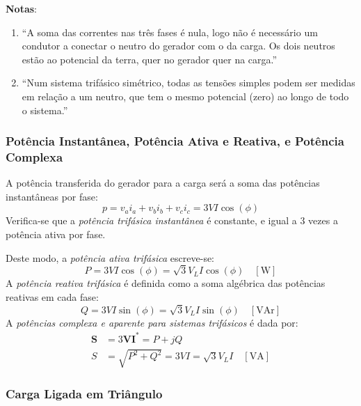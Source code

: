 \begin{mdframed} %
    \noindent \textbf{Notas}:
    \begin{enumerate}[noitemsep,nolistsep,leftmargin=*,label=\arabic*.,font=\small\bfseries]\small
        \item ``A soma das correntes nas três fases é nula, logo não é necessário um condutor a conectar o neutro do gerador com o da carga. Os dois neutros estão ao potencial da terra, quer no gerador quer na carga.''\cite{paiva2005}
        
        \item ``Num sistema trifásico simétrico, todas as tensões simples podem ser medidas em relação a um neutro, que tem o mesmo potencial (zero) ao longo de todo o sistema.''\cite{paiva2005}
    \end{enumerate}
\end{mdframed}

\subsubsection{Potência Instantânea, Potência Ativa e Reativa, e Potência Complexa}

A potência transferida do gerador para a carga será a soma das potências instantâneas por fase:
$$
    p = v_a i_a + v_b i_b + v_c i_c = 3 VI \cos(\phi)
$$
Verifica-se que a \textit{potência trifásica instantânea} é constante, e igual a 3 vezes a potência ativa por fase.

Deste modo, a \textit{potência ativa trifásica} escreve-se:
$$
    P = 3 VI \cos(\phi) = \sqrt{3} V_L I \cos (\phi) \quad [\text{W}]
$$
A \textit{potência reativa trifásica} é definida como a soma algébrica das potências reativas em cada fase:
$$
    Q = 3 VI \sin(\phi) = \sqrt{3} V_L I \sin (\phi) \quad [\text{VAr}]
$$
A \textit{potências complexa e aparente para sistemas trifásicos} é dada por:
$$
\begin{aligned}
    \mathbf{S} &= 3\mathbf{V} \mathbf{I}^* = P + jQ\\
    S &= \sqrt{P^2 + Q^2} = 3VI = \sqrt{3} V_L I \quad [\text{VA}]
\end{aligned}
$$

\subsubsection{Carga Ligada em Triângulo}

